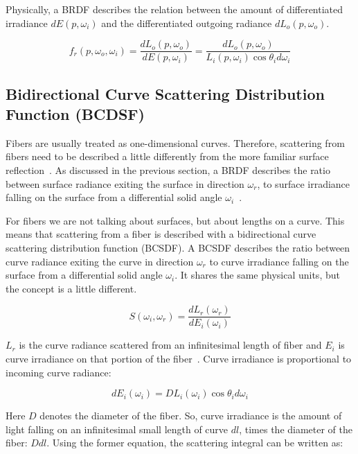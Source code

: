 \documentclass[11pt,a4paper]{report}
\begin{document}
Physically, a BRDF describes the relation between the amount of differentiated irradiance $dE(p, \omega_i)$ and the differentiated outgoing radiance $dL_o(p, \omega_o)$. 

\begin{equation}
f_r(p, \omega_o, \omega_i) = \frac{dL_o(p, \omega_o)}{dE(p,\omega_i)} = \frac{dL_o(p, \omega_o)}{L_i(p, \omega_i) \cos \theta_i d\omega_i}
\end{equation}

\subsection{Bidirectional Curve Scattering Distribution Function (BCDSF)}

Fibers are usually treated as one-dimensional curves. Therefore, scattering from fibers need to be described a little differently from the more familiar surface reflection~\cite{ward}. As discussed in the previous section, a BRDF describes the ratio between surface radiance exiting the surface in direction $\omega_r$, to surface irradiance falling on the surface from a differential solid angle $\omega_i$~\cite{ward}.

For fibers we are not talking about surfaces, but about lengths on a curve. This means that scattering from a fiber is described with a bidirectional curve scattering distribution function (BCSDF). A BCSDF describes the ratio between curve radiance exiting the curve in direction $\omega_r$ to curve irradiance falling on the surface from a differential solid angle $\omega_i$. It shares the same physical units, but the concept is a little different.

\begin{equation}
S(\omega_i, \omega_r) = \frac{dL_r(\omega_r)}{dE_i(\omega_i)}
\end{equation}

$L_r$ is the curve radiance scattered from an infinitesimal length of fiber and $E_i$ is curve irradiance on that portion of the fiber~\cite{marschner}. Curve irradiance is proportional to incoming curve radiance:

\begin{equation}
dE_i(\omega_i) = D L_i(\omega_i) \cos \theta_i d \omega_i
\end{equation}

Here $D$ denotes the diameter of the fiber. So, curve irradiance is the amount of light falling on an infinitesimal small length of curve $dl$, times the diameter of the fiber: $D dl$. Using the former equation, the scattering integral can be written as:
\end{document}

